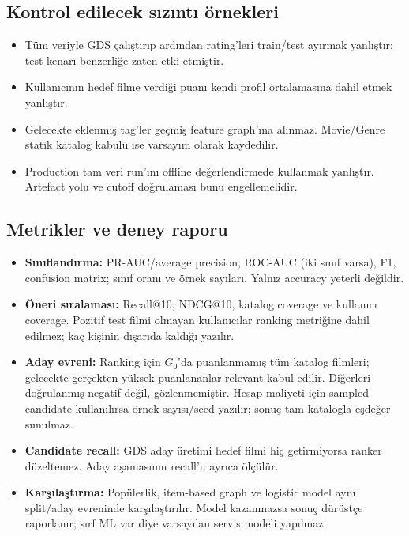 \documentclass[11pt,a4paper]{article}
\begin{document}
\subsection{Kontrol edilecek sızıntı örnekleri}
\begin{itemize}
\item Tüm veriyle GDS çalıştırıp ardından rating'leri train/test ayırmak yanlıştır; test kenarı benzerliğe zaten etki etmiştir.
\item Kullanıcının hedef filme verdiği puanı kendi profil ortalamasına dahil etmek yanlıştır.
\item Gelecekte eklenmiş tag'ler geçmiş feature graph'ına alınmaz. Movie/Genre statik katalog kabulü ise varsayım olarak kaydedilir.
\item Production tam veri run'ını offline değerlendirmede kullanmak yanlıştır. Artefact yolu ve cutoff doğrulaması bunu engellemelidir.
\end{itemize}

\subsection{Metrikler ve deney raporu}
\begin{itemize}
\item \textbf{Sınıflandırma:} PR-AUC/average precision, ROC-AUC (iki sınıf varsa), F1, confusion matrix; sınıf oranı ve örnek sayıları. Yalnız accuracy yeterli değildir.
\item \textbf{Öneri sıralaması:} Recall@10, NDCG@10, katalog coverage ve kullanıcı coverage. Pozitif test filmi olmayan kullanıcılar ranking metriğine dahil edilmez; kaç kişinin dışarıda kaldığı yazılır.
\item \textbf{Aday evreni:} Ranking için $G_0$'da puanlanmamış tüm katalog filmleri; gelecekte gerçekten yüksek puanlananlar relevant kabul edilir. Diğerleri doğrulanmış negatif değil, gözlenmemiştir. Hesap maliyeti için sampled candidate kullanılırsa örnek sayısı/seed yazılır; sonuç tam katalogla eşdeğer sunulmaz.
\item \textbf{Candidate recall:} GDS aday üretimi hedef filmi hiç getirmiyorsa ranker düzeltemez. Aday aşamasının recall'u ayrıca ölçülür.
\item \textbf{Karşılaştırma:} Popülerlik, item-based graph ve logistic model aynı split/aday evreninde karşılaştırılır. Model kazanmazsa sonuç dürüstçe raporlanır; sırf ML var diye varsayılan servis modeli yapılmaz.
\end{itemize}
\end{document}
